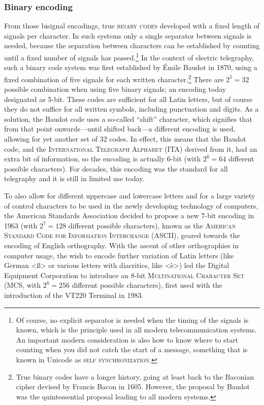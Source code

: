 \subsubsection*{Binary encoding}

From those bisignal encodings, true \textsc{binary codes} developed with a fixed
length of signals per character. In such systems only a single separator between
signals is needed, because the separation between characters can be established
by counting until a fixed number of signals has passed.\footnote{Of course, no
explicit separator is needed when the timing of the signals is known, which is
the principle used in all modern telecommunication systems. An important modern
consideration is also how to know where to start counting when you did not catch
the start of a message, something that is known in Unicode as \textsc{self
synchronization}.} In the context of electric telegraphy, such a binary code
system was first established by Émile Baudot in 1870, using a fixed combination
of five signals for each written character.\footnote{True binary codes have a
longer history, going at least back to the Baconian cipher devised by Francis
Bacon in 1605. However, the proposal by Baudot was the quintessential proposal
leading to all modern systems.} There are $2^5 = 32$ possible combination when
using five binary signals; an encoding today designated as 5-bit. These
codes are sufficient for all Latin letters, but of course they do not suffice
for all written symbols, including punctuation and digits. As a solution, the
Baudot code uses a so-called ``shift'' character, which signifies that from
that point onwards---until shifted back---a different encoding is used, allowing
for yet another set of 32 codes. In effect, this means that the Baudot code, and
the \textsc{International Telegraph Alphabet} (ITA) derived from it, had an
extra bit of information, so the encoding is actually 6-bit (with $2^6
= 64$ different possible characters). For decades, this encoding was the
standard for all telegraphy and it is still in limited use today.

To also allow for different uppercase and lowercase letters and for a large
variety of control characters to be used in the newly developing technology of
computers, the American Standards Association decided to propose a new 7-bit
encoding in 1963 (with $2^7 = 128$ different possible characters), known as the
\textsc{American Standard Code for Information Interchange} (ASCII), geared
towards the encoding of English orthography. With the ascent of other
orthographies in computer usage, the wish to encode further variation of Latin
letters (like German <ß> or various letters with diacritics, like <è>) led the
Digital Equipment Corporation to introduce an 8-bit \textsc{Multinational
Character Set} (MCS, with $2^8 = 256$ different possible characters), first used
with the introduction of the VT{\large 220} Terminal in 1983. 

